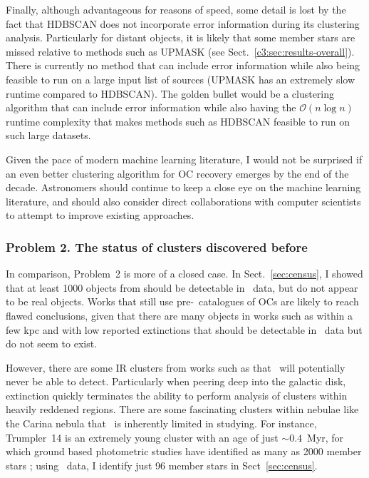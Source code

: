 Finally, although advantageous for reasons of speed, some detail is lost by the fact that HDBSCAN does not incorporate error information during its clustering analysis. Particularly for distant objects, it is likely that some member stars are missed relative to methods such as UPMASK (see Sect.~\ref{c3:sec:results-overall}). There is currently no method that can include error information while also being feasible to run on a large input list of sources (UPMASK has an extremely slow runtime compared to HDBSCAN). The golden bullet would be a clustering algorithm that can include error information while also having the $\mathcal{O}(n\log n)$ runtime complexity that makes methods such as HDBSCAN feasible to run on such large datasets.

Given the pace of modern machine learning literature, I would not be surprised if an even better clustering algorithm for OC recovery emerges by the end of the decade. Astronomers should continue to keep a close eye on the machine learning literature, and should also consider direct collaborations with computer scientists to attempt to improve existing approaches.


\subsubsection{Problem 2. The status of clusters discovered before \gaia}

In comparison, Problem~2 is more of a closed case. In Sect.~\ref{sec:census}, I showed that at least 1000 objects from \cite{kharchenko_global_2013} should be detectable in \gaia\ data, but do not appear to be real objects. Works that still use pre-\gaia\ catalogues of OCs \citep[such as the catalogue of OC masses in][]{just_global_survey_2023} are likely to reach flawed conclusions, given that there are many objects in works such as \cite{kharchenko_global_2013} within a few kpc and with low reported extinctions that should be detectable in \gaia\ data but do not seem to exist.

However, there are some IR clusters from works such as \cite{kharchenko_global_2013} that \gaia\ will potentially never be able to detect. Particularly when peering deep into the galactic disk, extinction quickly terminates the ability to perform analysis of clusters within heavily reddened regions. There are some fascinating clusters within nebulae like the Carina nebula that \gaia\ is inherently limited in studying. For instance, Trumpler~14 is an extremely young cluster with an age of just $\sim0.4$~Myr, for which ground based photometric studies have identified as many as 2000 member stars \citep{sana_mad_view_2010}; using \gaia\ data, I identify just 96 member stars in Sect~\ref{sec:census}. 

